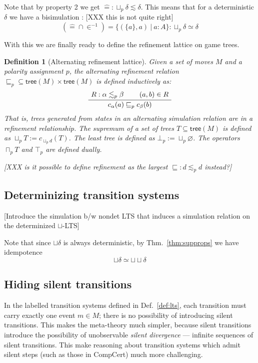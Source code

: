 \documentclass[11pt]{article}
\newcommand{\kw}[1]{{\mathsf{#1}}}
\newtheorem{definition}{Definition}
\begin{document}
Note that by property 2 we get ${\hat{=}} : \sqcup_p \delta \lesssim \delta$.
This means that for a deterministic $\delta$ we have a bisimulation :
[XXX this is not quite right]
\[ ({\hat{=}} \cap {\in^{-1}}) = \{(\{a\}, a) \:|\: a : A \} : \sqcup_p \delta
\simeq \delta \]

With this we are finally ready to define the refinement lattice on game trees.

\begin{definition}[Alternating refinement lattice]
Given a set of moves $M$ and a polarity assignment $p$,
the alternating refinement relation ${\sqsubseteq_p} \subseteq \kw{tree}(M)
\times \kw{tree}(M)$ is defined inductively as:
\[
  \AxiomC{$R : \alpha \lesssim_p \beta$}
  \AxiomC{$(a, b) \in R$}
  \BinaryInfC{$c_\alpha(a) \sqsubseteq_p c_\beta(b)$}
  \DisplayProof
\]
That is, trees generated from states in an alternating simulation relation
are in a refinement relationship.
The supremum of a set of trees $T \subseteq \kw{tree}(M)$
is defined as $\sqcup_p T := c_{\sqcup_p d}(T)$.
The least tree is defined as $\bot_p := \sqcup_p \varnothing$.
The operators $\sqcap_p T$ and $\top_p$ are defined dually.

[XXX is it possible to define refinement as the largest
${\sqsubseteq} : d \lesssim_p d$ instead?]
\end{definition}

\subsection{Determinizing transition systems}

[Introduce the simulation b/w nondet LTS that induces
a simulation relation on the determinized $\sqcup$-LTS]

Note that since $\sqcup \delta$ is always deterministic,
by Thm.~\ref{thm:supprops} we have idempotence
\[ {\sqcup \delta} \simeq {\sqcup}{\sqcup}\delta \]


\subsection{Hiding silent transitions}

In the labelled transition systems defined in Def.~\ref{def:lts},
each transition must carry exactly one event $m \in M$;
there is no possibility of introducing silent transitions.
This makes the meta-theory much simpler,
because silent transitions introduce the possibility of
unobservable \emph{silent divergence} ---
infinite sequences of silent transitions.
This make reasoning about transition systems
which admit silent steps (such as those in CompCert)
much more challenging.
\end{document}

